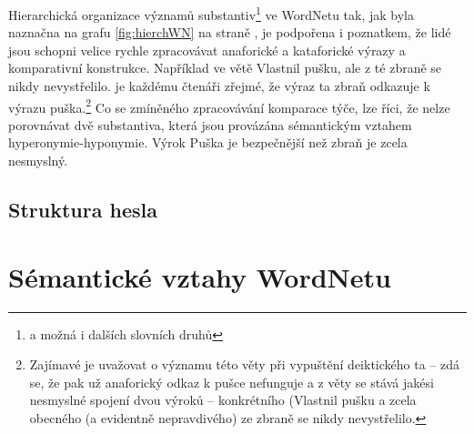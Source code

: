 \documentclass[a4paper, 11pt, oneside]{book}
\newcommand\ex{\textsf}
\begin{document}
			Hierarchická organizace významů substantiv\footnote{a možná i dalších slovních druhů} ve WordNetu tak, jak byla naznačna na grafu \ref{fig:hierchWN} na straně \pageref{fig:hierchWN}, je podpořena i poznatkem, že lidé jsou schopni velice rychle zpracovávat anaforické a kataforické výrazy a komparativní konstrukce. Například ve větě \ex{Vlastnil pušku, ale z té zbraně se nikdy nevystřelilo.} je každému čtenáři zřejmé, že výraz \ex{ta zbraň} odkazuje k výrazu \ex{puška}.\footnote{Zajímavé je uvažovat o významu této věty při vypuštění deiktického \ex{ta} -- zdá se, že pak už anaforický odkaz k \ex{pušce} nefunguje a z věty se stává jakési nesmyslné spojení dvou výroků -- konkrétního (\ex{Vlastnil pušku} a zcela obecného (a evidentně nepravdivého) \ex{ze zbraně se nikdy nevystřelilo}.} Co se zmíněného zpracovávání komparace týče, lze říci, že nelze porovnávat dvě substantiva, která jsou provázána sémantickým vztahem hyperonymie-hyponymie. Výrok \ex{Puška je bezpečnější než zbraň} je zcela nesmyslný. \parencite{pala2013vceska} %

			\subsection{Struktura hesla}



		


		\section{Sémantické vztahy WordNetu}
		\label{cha:sem-vztahy}
\end{document}
